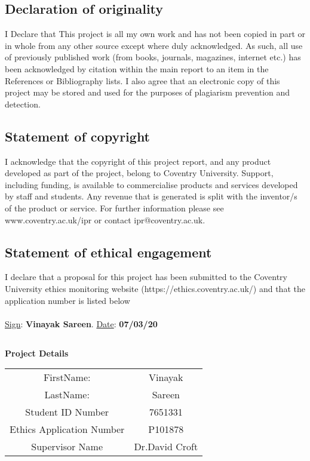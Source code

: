 \subsection*{Declaration of originality}
I Declare that This project is all my own work and has not been copied in part or in whole from any other source except where duly acknowledged.  As such, all use of previously published work (from books, journals, magazines, internet etc.) has been acknowledged by citation within the main report to an item in the References or Bibliography lists. I also agree that an electronic copy of this project may be stored and used for the purposes of plagiarism prevention and detection.
\subsection*{Statement of copyright}
I acknowledge that the copyright of this project report, and any product developed as part of the project, belong to Coventry University. 
Support, including funding, is available to commercialise products and services developed by staff and students. 
 Any revenue that is generated is split with the inventor/s of the product or service. 
For further information please see www.coventry.ac.uk/ipr or contact ipr@coventry.ac.uk.
\subsection*{Statement of ethical engagement}

I declare that a proposal for this project has been submitted to the Coventry University ethics monitoring website (https://ethics.coventry.ac.uk/) and that the application number is listed below \\
\\ 
\underline{Sign}: \textbf{Vinayak Sareen}. \hspace{20mm} \underline{Date}:  \textbf{07/03/20}
\pagebreak
\subsection*{}
\begin{center}
    \textbf{Project Details }\\
    \vspace{2mm}
\begin{tabular} {| c | c |}
	\hline
    FirstName: &Vinayak \\
    LastName: & Sareen \\
    Student ID Number & 7651331 \\
    Ethics Application Number & P101878 \\
    Supervisor Name & Dr.David Croft \\
    \hline
\end{tabular}
\end{center}
